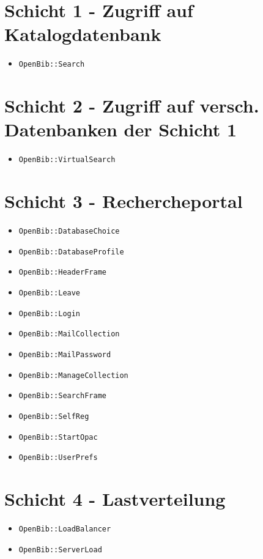 \documentclass[11pt, twoside, a4paper, BCOR8mm, DIV12, bibtotoc,idxtotoc]{scrbook}
\begin{document}
\section{Schicht 1 - Zugriff auf Katalogdatenbank}

\begin{itemize}
\item \texttt{OpenBib::Search}
\end{itemize}

\section{Schicht 2 - Zugriff auf versch. Datenbanken der Schicht 1}

\begin{itemize}
\item \texttt{OpenBib::VirtualSearch}
\end{itemize}

\section{Schicht 3 - Rechercheportal}

\begin{itemize}
\item \texttt{OpenBib::DatabaseChoice}
\item \texttt{OpenBib::DatabaseProfile}
\item \texttt{OpenBib::HeaderFrame}
\item \texttt{OpenBib::Leave}
\item \texttt{OpenBib::Login}
\item \texttt{OpenBib::MailCollection}
\item \texttt{OpenBib::MailPassword}
\item \texttt{OpenBib::ManageCollection}
\item \texttt{OpenBib::SearchFrame}
\item \texttt{OpenBib::SelfReg}
\item \texttt{OpenBib::StartOpac}
\item \texttt{OpenBib::UserPrefs}
\end{itemize}

\section{Schicht 4 - Lastverteilung}

\begin{itemize}
\item \texttt{OpenBib::LoadBalancer}
\item \texttt{OpenBib::ServerLoad}
\end{itemize}
\end{document}
